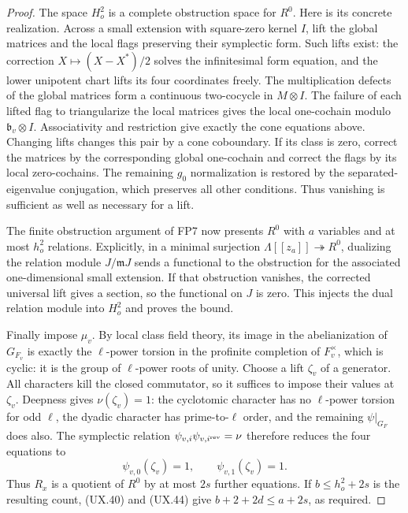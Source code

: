 \begin{proof}
The space $H^2_o$ is a complete obstruction
space for $R^0$.  Here is its concrete
realization.  Across a small extension
with square-zero kernel $I$, lift the
global matrices and the local flags
preserving their symplectic form.  Such
lifts exist: the correction
$X\mapsto(X-X^*)/2$ solves the infinitesimal
form equation, and the lower unipotent
chart lifts its four coordinates freely.
The multiplication defects of the global
matrices form a continuous two-cocycle
in $M\otimes I$.  The failure of each
lifted flag to triangularize the local
matrices gives the local one-cochain
modulo $\mathfrak b_v\otimes I$.
Associativity and restriction give exactly
the cone equations above.  Changing
lifts changes this pair by a cone
coboundary.  If its class is zero,
correct the matrices by the corresponding
global one-cochain and correct the
flags by its local zero-cochains.
The remaining $g_0$ normalization is
restored by the separated-eigenvalue
conjugation, which preserves all other
conditions.  Thus vanishing is sufficient
as well as necessary for a lift.

The finite obstruction argument of FP7
now presents $R^0$ with $a$ variables
and at most $h^2_o$ relations.  Explicitly,
in a minimal surjection $\Lambda[[z_a]]
\twoheadrightarrow R^0$, dualizing the
relation module $J/\mathfrak mJ$ sends a
functional to the obstruction for the
associated one-dimensional small
extension.  If that obstruction vanishes,
the corrected universal lift gives a
section, so the functional on $J$ is zero.
This injects the dual relation module
into $H^2_o$ and proves the bound.

Finally impose $\mu_v$.  By local class
field theory, its image in the abelianization
of $G_{F_v}$ is exactly the $\ell$-power
torsion in the profinite completion of
$F_v^\times$, which is cyclic: it is
the group of $\ell$-power roots of unity.
Choose a lift $\zeta_v$ of a generator.
All characters kill the closed commutator,
so it suffices to impose their values
at $\zeta_v$.  Deepness gives
$\nu(\zeta_v)=1$: the cyclotomic character
has no $\ell$-power torsion for odd $\ell$,
the dyadic character has prime-to-$\ell$
order, and the remaining $\psi|_{G_F}$
does also.  The symplectic relation
$\psi_{v,i}\psi_{v,i^{\rm rev}}=\nu$
therefore reduces the four equations to
\[
             \psi_{v,0}(\zeta_v)=1,\qquad
             \psi_{v,1}(\zeta_v)=1 .
 \tag{UX.45}
\]
Thus $R_x$ is a quotient of $R^0$ by
at most $2s$ further equations.  If
$b\le h^2_o+2s$ is the resulting count,
(UX.40) and (UX.44) give
$b+2+2d\le a+2s$, as required.
\end{proof}

